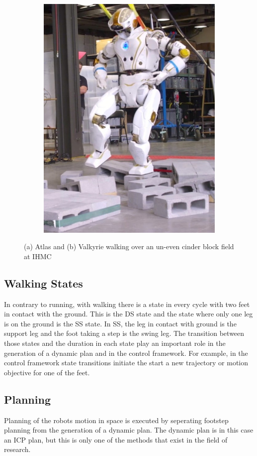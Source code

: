 \begin{figure}[h]
\begin{subfigure}{0.45\textwidth}
  \includegraphics[width=.8\linewidth]{STYLESTUFF/Valkyrie.jpeg}
  \caption{}
   \label{fig:valkyrie}
  \end{subfigure}
  \caption{(a) Atlas \cite{oldatlas} and (b) Valkyrie \cite{valkyrie} walking over an un-even cinder block field at IHMC }
  \label{fig:robots}
\end{figure}
\subsection{Walking States}
In contrary to running, with walking there is a state in every cycle with two feet in contact with the ground. This is the \ac{DS} state and the state where only one leg is on the ground is the \ac{SS} state. In \ac{SS}, the leg in contact with ground is the support leg and the foot taking a step is the swing leg. The transition between those states and the duration in each state play an important role in the generation of a dynamic plan and in the control framework. For example, in the control framework state transitions initiate the start a new trajectory or motion objective for one of the feet.
\subsection{Planning}
Planning of the robots motion in space is executed by seperating footstep planning from the generation of a dynamic plan. The dynamic plan is in this case an \ac{ICP} plan, but this is only one of the methods that exist in the field of research.
